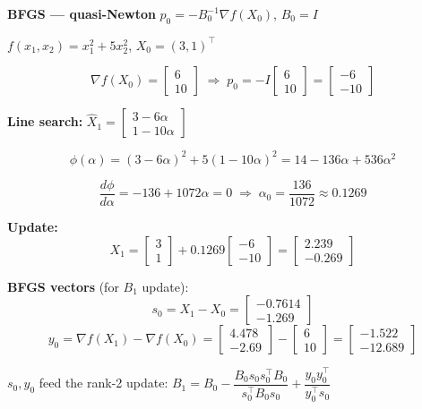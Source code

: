 \documentclass[10pt,a3paper]{article}
\begin{document}
\begin{minipage}[t]{0.46\linewidth}
\textbf{BFGS — quasi-Newton} \quad $p_0 = -B_0^{-1}\nabla f(X_0)$,\; $B_0=I$

$f(x_1,x_2)=x_1^2+5x_2^2$,\; $X_0=(3,1)^\top$

\[
  \nabla f(X_0) = \begin{bmatrix}6\\10\end{bmatrix}
  \;\Rightarrow\;
  p_0 = -I\begin{bmatrix}6\\10\end{bmatrix} = \begin{bmatrix}-6\\-10\end{bmatrix}
\]

\textbf{Line search:} $\hat{X}_1 = \begin{bmatrix}3-6\alpha\\1-10\alpha\end{bmatrix}$

\[
  \phi(\alpha) = (3-6\alpha)^2+5(1-10\alpha)^2 = 14-136\alpha+536\alpha^2
\]

\[
  \frac{d\phi}{d\alpha}=-136+1072\alpha=0
  \;\Rightarrow\; \alpha_0=\frac{136}{1072}\approx 0.1269
\]

\textbf{Update:}
\[
  X_1 = \begin{bmatrix}3\\1\end{bmatrix}+0.1269\begin{bmatrix}-6\\-10\end{bmatrix}
      = \begin{bmatrix}2.239\\-0.269\end{bmatrix}
\]

\textbf{BFGS vectors} (for $B_1$ update):
\[
  s_0 = X_1-X_0 = \begin{bmatrix}-0.7614\\-1.269\end{bmatrix}
\]
\[
  y_0 = \nabla f(X_1)-\nabla f(X_0)
      = \begin{bmatrix}4.478\\-2.69\end{bmatrix}-\begin{bmatrix}6\\10\end{bmatrix}
      = \begin{bmatrix}-1.522\\-12.689\end{bmatrix}
\]

$s_0,y_0$ feed the rank-2 update: $B_1 = B_0 - \dfrac{B_0 s_0 s_0^\top B_0}{s_0^\top B_0 s_0} + \dfrac{y_0 y_0^\top}{y_0^\top s_0}$

\end{minipage}
\end{document}
